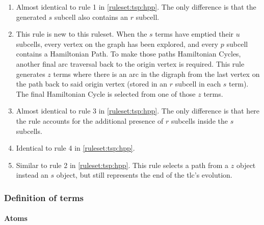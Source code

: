 \begin{enumerate}
    \item Almost identical to rule 1 in \cref{ruleset:tsp:hpp}.  The only difference is that the generated \(s\) subcell also contains an \(r\) subcell.
    \item This rule is new to this ruleset.  When the \(s\) terms have emptied their \(u\) subcells, every vertex on the graph has been explored, and every \(p\) subcell contains a Hamiltonian Path.  To make those paths Hamiltonian Cycles, another final arc traversal back to the origin vertex is required.  This rule generates \(z\) terms where there is an arc in the digraph from the last vertex on the path back to said origin vertex (stored in an \(r\) subcell in each \(s\) term).  The final Hamiltonian Cycle is selected from one of those \(z\) terms.
    \item Almost identical to rule 3 in \cref{ruleset:tsp:hpp}.  The only difference is that here the rule accounts for the additional presence of \(r\) subcells inside the \(s\) subcells.
    \item Identical to rule 4 in \cref{ruleset:tsp:hpp}.
    \item Similar to rule 2 in \cref{ruleset:tsp:hpp}.  This rule selects a path from a \(z\) object instead an \(s\) object, but still represents the end of the \gls{tlc}'s evolution.
\end{enumerate}

\subsubsection{Definition of terms}

\paragraph{Atoms}
\begin{description}
\end{description}

